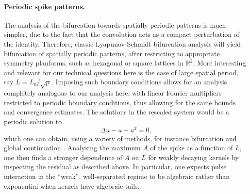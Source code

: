 \documentclass[10pt]{article}
\newcommand{\R}{\mathbb{R}}
\newcommand{\K}{\mathcal{K}}
\begin{document}
\paragraph{Periodic spike patterns.} The analysis of the bifurcation towards spatially periodic patterns is much simpler, due to the fact that the convolution acts as a compact perturbation of the identity. Therefore, classic Lyapunov-Schmidt bifurcation analysis will yield bifurcation of spatially periodic patterns, after restricting to appropriate symmetry planforms, such as hexagonal or square lattices in $\R^2$. More interesting and relevant for our technical questions here is the case of large spatial period, say $L= L_0/\sqrt\mu$. Imposing such boundary conditions allows for an analysis completely analogous to our analysis here, with linear Fourier multipliers restricted to periodic boundary conditions, thus allowing for the same bounds and convergence estimates. The solutions in the rescaled system would be a periodic solution to 
\[
\Delta u -u+u^2=0, 
\]
which one can obtain, using a variety of methods, for instance bifurcation and global continuation \cite{kiel}. Analyzing the maximum $A$ of the spike as a function of $L$, one then finds a stronger dependence of $A$ on $L$ for weakly decaying kernels by inspecting the residual as described above. In particular, one expects pulse interaction in the ``weak'', well-separated regime to be algebraic rather than exponential when kernels have algebraic tails. 

% 
\end{document}
